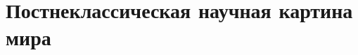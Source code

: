 \documentclass[a4paper, 12pt, notitlepage]{report}
\begin{document}
%

%

\setcounter{chapter}{10}

\chapter{Постнеклассическая научная картина мира}


%

%
\end{document}
